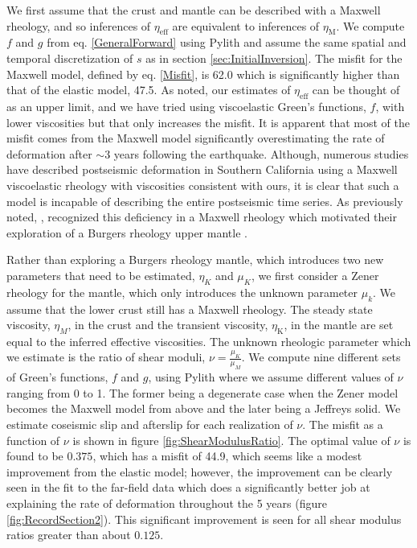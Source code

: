 \documentclass[1p]{elsarticle}
\begin{document}
We first assume that the crust and mantle can be described with a Maxwell rheology, and so inferences of $\eta_{\mathrm{eff}}$ are equivalent to inferences of $\eta_{\mathrm{M}}$. We compute $f$ and $g$ from eq. \ref{GeneralForward} using Pylith \citep{Aagaard2009} and assume the same spatial and temporal discretization of $s$ as in section \ref{sec:InitialInversion}. The misfit for the Maxwell model, defined by eq. \ref{Misfit}, is 62.0 which is significantly higher than that of the elastic model, 47.5. As noted, our estimates of $\eta_\mathrm{eff}$ can be thought of as an upper limit, and we have tried using viscoelastic Green's functions, $f$, with lower viscosities but that only increases the misfit. It is apparent that most of the misfit comes from the Maxwell model significantly overestimating the rate of deformation after $\sim 3$ years following the earthquake.  Although, numerous studies have described postseismic deformation in Southern California using a Maxwell viscoelastic rheology with viscosities consistent with ours, it is clear that such a model is incapable of describing the entire postseismic time series. As previously noted, \cite{Pollitz2001}, recognized this deficiency in a Maxwell rheology which motivated their exploration of a Burgers rheology upper mantle \citep{Pollitz2003}.  

Rather than exploring a Burgers rheology mantle, which introduces two new parameters that need to be estimated, $\eta_{K}$ and $\mu_{K}$, we first consider a Zener rheology for the mantle, which only introduces the unknown parameter $\mu_{k}$.  We assume that the lower crust still has a Maxwell rheology. The steady state viscosity, $\eta_{M}$, in the crust and the transient viscosity, $\eta_\mathrm{K}$, in the mantle are set equal to the inferred effective viscosities. The unknown rheologic parameter which we estimate is the ratio of shear moduli, $\nu=\frac{\mu_K}{\mu_M}$. We compute nine different sets of Green's functions, $f$ and $g$, using Pylith where we assume different values of $\nu$ ranging from 0 to 1. The former being a degenerate case when the Zener model becomes the Maxwell model from above and the later being a Jeffreys solid.  We estimate coseismic slip and afterslip for each realization of $\nu$.  The misfit as a function of $\nu$ is shown in figure \ref{fig:ShearModulusRatio}.  The optimal value of $\nu$ is found to be $0.375$, which has a misfit of 44.9,  which seems like a modest improvement from the elastic model; however, the improvement can be clearly seen in the fit to the far-field data which does a significantly better job at explaining the rate of deformation throughout the 5 years (figure \ref{fig:RecordSection2}).  This significant improvement is seen for all shear modulus ratios greater than about $0.125$. 
\end{document}
